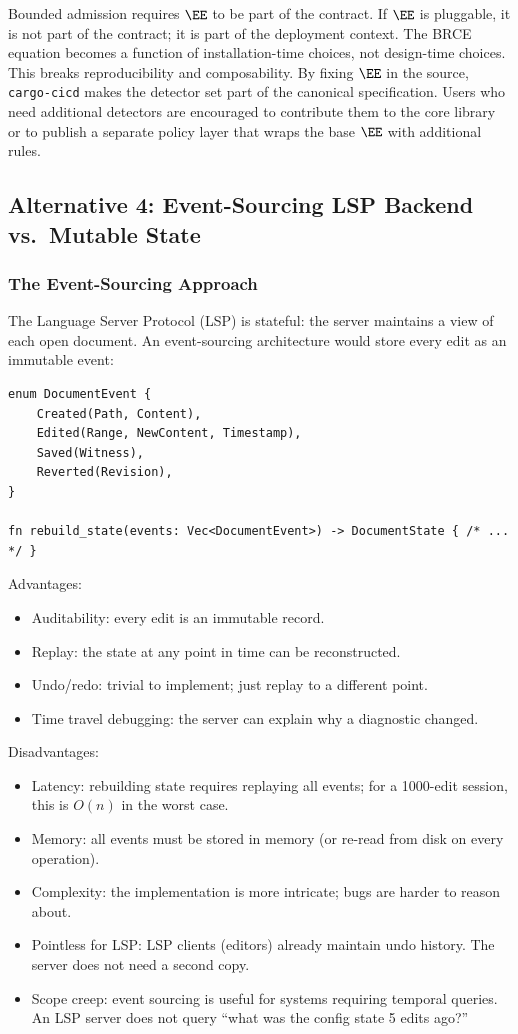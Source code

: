 Bounded admission requires $\EE$ to be part of the contract. If $\EE$ is pluggable, it is not part of the contract; it is part of the deployment context. The BRCE equation becomes a function of installation-time choices, not design-time choices. This breaks reproducibility and composability. By fixing $\EE$ in the source, \texttt{cargo-cicd} makes the detector set part of the canonical specification. Users who need additional detectors are encouraged to contribute them to the core library or to publish a separate policy layer that wraps the base $\EE$ with additional rules.

\subsection{Alternative 4: Event-Sourcing LSP Backend vs.\ Mutable State}

\subsubsection{The Event-Sourcing Approach}

The Language Server Protocol (LSP) is stateful: the server maintains a view of each open document. An event-sourcing architecture would store every edit as an immutable event:

\begin{lstlisting}[caption={Event-sourced LSP backend}]
enum DocumentEvent {
    Created(Path, Content),
    Edited(Range, NewContent, Timestamp),
    Saved(Witness),
    Reverted(Revision),
}

fn rebuild_state(events: Vec<DocumentEvent>) -> DocumentState { /* ... */ }
\end{lstlisting}

Advantages:
\begin{itemize}
  \item Auditability: every edit is an immutable record.
  \item Replay: the state at any point in time can be reconstructed.
  \item Undo/redo: trivial to implement; just replay to a different point.
  \item Time travel debugging: the server can explain why a diagnostic changed.
\end{itemize}

Disadvantages:
\begin{itemize}
  \item Latency: rebuilding state requires replaying all events; for a 1000-edit session, this is $O(n)$ in the worst case.
  \item Memory: all events must be stored in memory (or re-read from disk on every operation).
  \item Complexity: the implementation is more intricate; bugs are harder to reason about.
  \item Pointless for LSP: LSP clients (editors) already maintain undo history. The server does not need a second copy.
  \item Scope creep: event sourcing is useful for systems requiring temporal queries. An LSP server does not query ``what was the config state 5 edits ago?''
\end{itemize}

